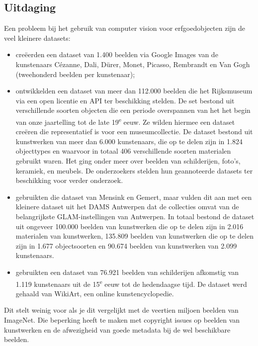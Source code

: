 \subsection{Uitdaging}
\label{subsec:cv-voor-ce-uitdaging}

Een probleem bij het gebruik van computer vision voor erfgoedobjecten zijn de veel kleinere datasets: 
\begin{itemize}
	\item \textcite{Blessings2013} cre\"{e}erden een dataset van 1.400 beelden via Google Images van de kunstenaars C\'{e}zanne, Dali, D\"{u}rer, Monet, Picasso, Rembrandt en Van Gogh (tweehonderd beelden per kunstenaar);
	\item \textcite{Mensink2014} ontwikkelden een dataset van meer dan 112.000 beelden die het Rijksmuseum via een open licentie en API ter beschikking stelden. De set bestond uit verschillende soorten objecten die een periode overspannen van het het begin van onze jaartelling tot de late 19\textsuperscript{e} eeuw. Ze wilden hiermee een dataset cre\"{e}ren die representatief is voor een museumcollectie. De dataset bestond uit kunstwerken van meer dan 6.000 kunstenaars, die op te delen zijn in 1.824 objecttypes en waarvoor in totaal 406 verschillende soorten materialen gebruikt waren. Het ging onder meer over beelden van schilderijen, foto’s, keramiek, en meubels. De onderzoekers stelden hun geannoteerde datasets ter beschikking voor verder onderzoek.
	\item \textcite{Sabatteli2018?} gebruikten die dataset van Mensink en Gemert, maar vulden dit aan met een kleinere dataset uit het DAMS Antwerpen dat de collecties omvat van de belangrijkste GLAM-instellingen van Antwerpen. In totaal bestond de dataset uit ongeveer 100.000 beelden van kunstwerken die op te delen zijn in 2.016 materialen van kunstwerken, 135.809 beelden van kunstwerken die op te delen zijn in 1.677 objectsoorten en 90.674 beelden van kunstwerken van 2.099 kunstenaars.
	\item \textcite{Elgammal2018} gebruikten een dataset van 76.921 beelden van schilderijen afkomstig van 1.119 kunstenaars uit de 15\textsuperscript{e} eeuw tot de hedendaagse tijd.  De dataset werd gehaald van WikiArt, een online kunstencyclopedie.
\end{itemize}

Dit stelt weinig voor als je dit vergelijkt met de veertien miljoen beelden van ImageNet. Die beperking heeft te maken met copyright issues op beelden van kunstwerken en de afwezigheid van goede metadata bij de wel beschikbare beelden. 

